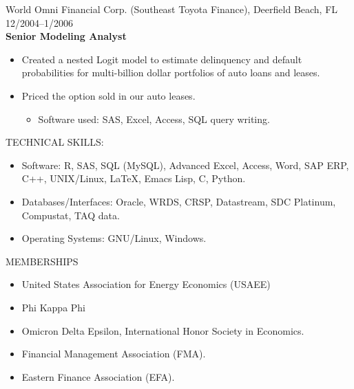 \documentclass[9pt]{article}
\begin{document}
\vspace{5pt}
World Omni Financial Corp. (Southeast Toyota Finance), Deerfield Beach, FL \hfill  \hfill 12/2004--1/2006\\
{\bf Senior Modeling Analyst}
\begin{itemize}[noitemsep, nolistsep]
\item Created a nested Logit model to estimate delinquency and default probabilities for multi-billion dollar portfolios of auto loans and leases.
\item Priced the option sold in our auto leases.
\begin{itemize}[noitemsep, nolistsep]
\item Software used:  SAS, Excel, Access, SQL query writing.
\end{itemize}
\end{itemize}
\vspace{10pt}
TECHNICAL SKILLS:
\begin{itemize}[noitemsep, nolistsep]
\item Software: R, SAS, SQL (MySQL), Advanced Excel, Access, Word, SAP ERP, C++, UNIX/Linux, \LaTeX, Emacs Lisp, C, Python. 
\item Databases/Interfaces: Oracle, WRDS, CRSP, Datastream, SDC Platinum, Compustat, TAQ data.
\item Operating Systems: GNU/Linux, Windows.
\end{itemize}
\vspace{10pt}
MEMBERSHIPS
\begin{itemize}[noitemsep, nolistsep]
\item United States Association for Energy Economics (USAEE)
\item Phi Kappa Phi
\item Omicron Delta Epsilon, International Honor Society in Economics.
\item Financial Management Association (FMA).
\item Eastern Finance Association (EFA).
\end{itemize}
\vspace{15pt}
\end{document}
